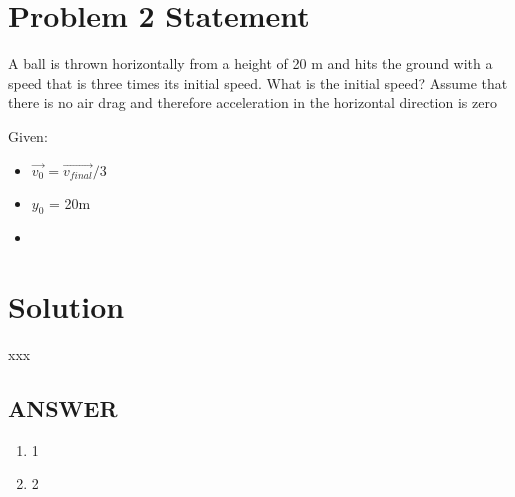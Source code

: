 \section*{Problem 2 Statement}

A ball is thrown horizontally from a height of 20 m and hits the ground with a speed that is three
times its initial speed. What is the initial speed? Assume that there is no air drag and therefore
acceleration in the horizontal direction is zero 

\bigbreak Given:
\begin{itemize}
    \item $\vec{v_0} = \vec{v_{final}} / 3  $
    \item $y_0$ = 20m
    \item 
\end{itemize}

\section*{Solution}





xxx

\vfill
\subsection*{ANSWER}
\begin{enumerate}
    \item 1
    \item 2
\end{enumerate}